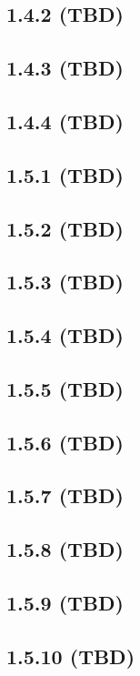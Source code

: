 \documentclass[11pt]{article}
\begin{document}
\subsection*{1.4.2 (TBD)}

\subsection*{1.4.3 (TBD)}

\subsection*{1.4.4 (TBD)}

\subsection*{1.5.1 (TBD)}
\subsection*{1.5.2 (TBD)}
\subsection*{1.5.3 (TBD)}
\subsection*{1.5.4 (TBD)}
\subsection*{1.5.5 (TBD)}
\subsection*{1.5.6 (TBD)}
\subsection*{1.5.7 (TBD)}
\subsection*{1.5.8 (TBD)}
\subsection*{1.5.9 (TBD)}
\subsection*{1.5.10 (TBD)}
\end{document}
